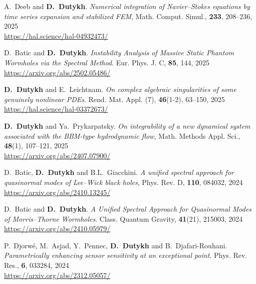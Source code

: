 \documentclass[final, a4paper, oneside, 12pt]{article}
\numberwithin{equation}{section}
\begin{document}
\begin{etaremune}
  \item A.~Deeb and \textbf{D.~Dutykh}. \textit{Numerical integration of Navier--Stokes equations by time series expansion and stabilized FEM}, Math. Comput. Simul., \textbf{233}, 208--236, 2025 \\ %
  \url{https://hal.science/hal-04932473/}

  \item D.~Batic and \textbf{D.~Dutykh}. \textit{Instability Analysis of Massive Static Phantom Wormholes via the Spectral Method}. Eur. Phys. J. C, \textbf{85}, 144, 2025 \\ %
  \url{https://arxiv.org/abs/2502.05486/}

  \item \textbf{D.~Dutykh} and E.~Leichtnam. \textit{On complex algebraic singularities of some genuinely nonlinear PDEs}. Rend. Mat. Appl. (7), \textbf{46}(1-2), 63--150, 2025 \\ %
  \url{https://hal.science/hal-03372673/}

  \item \textbf{D.~Dutykh} and Ya.~Prykarpatsky. \textit{On integrability of a new dynamical system associated with the BBM-type hydrodynamic flow}, Math. Methods Appl. Sci., \textbf{48}(1), 107--121, 2025 \\ %
  \url{https://arxiv.org/abs/2407.07900/}



  \item D.~Batic, \textbf{D.~Dutykh} and B.L.~Giacchini. \textit{A unified spectral approach for quasinormal modes of Lee--Wick black holes}, Phys. Rev. D, \textbf{110}, 084032, 2024 \\ %
  \url{https://arxiv.org/abs/2410.13245/}

  \item D.~Batic and \textbf{D.~Dutykh}. \textit{A Unified Spectral Approach for Quasinormal Modes of Morris--Thorne Wormholes}. Class. Quantum Gravity, \textbf{41}(21), 215003, 2024 \\ %
  \url{https://arxiv.org/abs/2410.05979/}

  \item P.~Djorw\'e, M.~Asjad, Y.~Pennec, \textbf{D.~Dutykh} and B.~Djafari-Rouhani. \textit{Parametrically enhancing sensor sensitivity at an exceptional point}. Phys. Rev. Res., \textbf{6}, 033284, 2024 \\ %
  \url{https://arxiv.org/abs/2312.05057/}
  

\end{etaremune}
\end{document}
